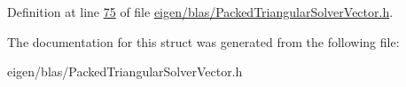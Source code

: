 Definition at line \hyperlink{eigen_2blas_2_packed_triangular_solver_vector_8h_source_l00075}{75} of file \hyperlink{eigen_2blas_2_packed_triangular_solver_vector_8h_source}{eigen/blas/\+Packed\+Triangular\+Solver\+Vector.\+h}.



The documentation for this struct was generated from the following file\+:\begin{DoxyCompactItemize}
\item 
eigen/blas/\+Packed\+Triangular\+Solver\+Vector.\+h\end{DoxyCompactItemize}
